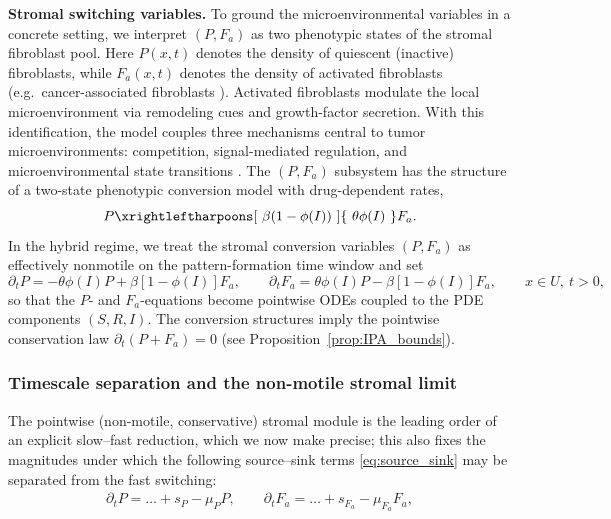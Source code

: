 \documentclass[pdflatex,sn-mathphys-ay]{sn-jnl}
\theoremstyle{thmstyleone}
\theoremstyle{definition}
\theoremstyle{remark}
\begin{document}
\medskip
\noindent\textbf{Stromal switching variables.}
To ground the microenvironmental variables in a concrete setting, we interpret $(P,F_a)$ as two phenotypic states of the stromal fibroblast pool. 
Here $P(x,t)$ denotes the density of quiescent (inactive) fibroblasts, while $F_a(x,t)$ denotes the density of activated fibroblasts (e.g.\ cancer-associated fibroblasts \citep{sahai2020framework,yu2026size}). 
Activated fibroblasts modulate the local microenvironment via remodeling cues and growth-factor secretion. 
With this identification, the model couples three mechanisms central to tumor microenvironments: competition, signal-mediated regulation, and microenvironmental state transitions \citep{farhood2018tumor,david2025role,zhang2024tumor,liang2026separation,yuan2016spatial,wells2015spatial}. 
The $(P,F_a)$ subsystem has the structure of a two-state phenotypic conversion model with drug-dependent rates,
\[
P \xrightleftharpoons[\ \beta(1-\phi(I))\ ]{\ \theta\phi(I)\ } F_a.
\]
In the hybrid regime, we treat the stromal conversion variables $(P,F_a)$ as effectively nonmotile on the pattern-formation time window and set
\begin{equation*}
    \partial_t P = -\theta\phi(I)P + \beta [1-\phi(I)]F_a,\qquad \partial_t F_a = \theta\phi(I)P-\beta [1-\phi(I)]F_a,\qquad x\in U, \ t>0,
\end{equation*}
so that the $P$- and $F_a$-equations become pointwise ODEs coupled to the PDE components $(S,R,I)$. 
The conversion structures imply the pointwise conservation law $\partial_t(P+F_a)=0$ (see Proposition~\ref{prop:IPA_bounds}). 

\subsubsection{Timescale separation and the non-motile stromal limit}
\label{subsubsec:timescales}
The pointwise (non-motile, conservative) stromal module is the leading order of
an explicit slow--fast reduction, which we now make precise; this also fixes the
magnitudes under which the following source--sink terms \eqref{eq:source_sink} may be
separated from the fast switching:
\begin{align}
\label{eq:source_sink}
\partial_t P = \dots + s_P - \mu_P P,
\qquad
\partial_t F_a = \dots + s_{F_a} - \mu_{F_a} F_a,
\end{align}
\end{document}

